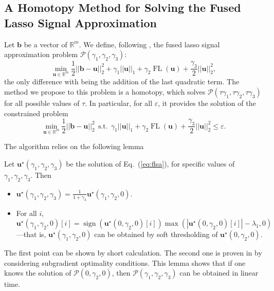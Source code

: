 \documentclass[twoside,11pt]{article}
\def\P{{\mathcal P}}
\def\b{{\mathbf b}}
\def\u{{\mathbf u}}
\def\Real{{\mathbb R}}
\def\u{{\mathbf u}}
\def\sign{\operatorname{sign}}
\def\FL{\operatorname{FL}}
\def\st{~~\text{s.t.}~~}
\begin{document}
\subsection{A Homotopy Method for Solving the Fused Lasso Signal Approximation} \label{appendix:sec:fused}
Let $\b$ be a vector of $\Real^m$. We define, following \citet{friedman}, the fused
lasso signal approximation problem $\P(\gamma_1,\gamma_2,\gamma_3)$:
\begin{equation}
   \min_{\u \in \Real^m} \frac{1}{2}||\b-\u||_2^2 + \gamma_1||\u||_1 +
   \gamma_2 \FL(\u) + \frac{\gamma_3}{2}||\u||_2^2, \label{eq:flsa}
\end{equation}
the only difference with \citet{friedman} being the addition of the last
quadratic term.
The method we propose to this problem is a homotopy, which solves
$\P(\tau\gamma_1,\tau\gamma_2,\tau\gamma_3)$ for all
possible values of $\tau$. In particular, for all $\varepsilon$,
it provides the solution of the constrained problem
\begin{equation}
   \min_{\u \in \Real^m} \frac{1}{2}||\b-\u||_2^2 \st \gamma_1||\u||_1 +
   \gamma_2 \FL(\u) + \frac{\gamma_3}{2}||\u||_2^2 \leq \varepsilon.  \label{eq:fusedConstrained}
\end{equation}

The algorithm relies on the following lemma
\begin{lemma}
   Let $\u^\star(\gamma_1,\gamma_2,\gamma_3)$ be the solution of
   Eq.~(\ref{eq:flsa}), for specific values of $\gamma_1,\gamma_2,\gamma_3$.
   Then
   \begin{itemize}
      \item $\u^\star(\gamma_1,\gamma_2,\gamma_3) =
         \frac{1}{1+\gamma_3}\u^\star(\gamma_1,\gamma_2,0)$.
      \item For all $i$, $\u^\star(\gamma_1,\gamma_2,0)[i] =
         \sign(\u^\star(0,\gamma_2,0)[i])\max(|\u^\star(0,\gamma_2,0)[i]|-\lambda_1,0)$---that
         is, $\u^\star(\gamma_1,\gamma_2,0)$ can be obtained by soft thresholding of $\u^\star(0,\gamma_2,0)$.
   \end{itemize}
\end{lemma}
The first point can be shown by short calculation. The second one is proven
in \citet{friedman} by considering subgradient optimality conditions.  This
lemma shows that if one knows the solution of $\P(0,\gamma_2,0)$, then
$\P(\gamma_1,\gamma_2,\gamma_3)$ can be obtained in linear time.
\end{document}
